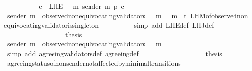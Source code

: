 \begin{isabellebody}
\ \ \ \ \ \ \isamarkupfalse%
\ \isamarkupfalse%
\ {\isachardoublequoteopen}{\isasymforall}\ c\ {\isasymin}\ L{\isacharunderscore}H{\isacharunderscore}E\ {\isacharparenleft}{\isasymsigma}\ {\isasymunion}\ {\isacharbraceleft}m{\isacharbraceright}{\isacharparenright}\ {\isacharparenleft}sender\ m{\isacharparenright}{\isachardot}\ p\ c{\isachardoublequoteclose}\isanewline
\ \ \ \ \ \ \ \ \isamarkupfalse%
\ {\isacartoucheopen}sender\ m\ {\isasymin}\ observed{\isacharunderscore}non{\isacharunderscore}equivocating{\isacharunderscore}validators\ {\isacharparenleft}{\isasymsigma}\ {\isasymunion}\ {\isacharbraceleft}m{\isacharbraceright}{\isacharparenright}{\isacartoucheclose}\ {\isacartoucheopen}{\isasymsigma}\ {\isasymunion}\ {\isacharbraceleft}m{\isacharbraceright}\ {\isasymin}\ {\isasymSigma}t{\isacartoucheclose}\ L{\isacharunderscore}H{\isacharunderscore}M{\isacharunderscore}of{\isacharunderscore}observed{\isacharunderscore}non{\isacharunderscore}equivocating{\isacharunderscore}validator{\isacharunderscore}is{\isacharunderscore}singleton\isanewline
\ \ \ \ \ \ \ \ \isamarkupfalse%
\ {\isacharparenleft}simp\ add{\isacharcolon}\ L{\isacharunderscore}H{\isacharunderscore}E{\isacharunderscore}def\ L{\isacharunderscore}H{\isacharunderscore}J{\isacharunderscore}def{\isacharparenright}\ \ \ \ \ \ \isanewline
\ \ \ \ \ \ \ \ \isamarkupfalse%
\isanewline
\ \ \ \ \ \ \isamarkupfalse%
\ \isamarkupfalse%
\ {\isacharquery}thesis\ \ \isanewline
\ \ \ \ \ \ \ \ \isamarkupfalse%
\ {\isacartoucheopen}sender\ m\ {\isasymin}\ observed{\isacharunderscore}non{\isacharunderscore}equivocating{\isacharunderscore}validators\ {\isacharparenleft}{\isasymsigma}\ {\isasymunion}\ {\isacharbraceleft}m{\isacharbraceright}{\isacharparenright}{\isacartoucheclose}\isanewline
\ \ \ \ \ \ \ \ \isamarkupfalse%
\ {\isacharparenleft}simp\ add{\isacharcolon}\ agreeing{\isacharunderscore}validators{\isacharunderscore}def\ agreeing{\isacharunderscore}def{\isacharparenright}\ \ \ \ \ \ \ \isanewline
\ \ \ \ \isamarkupfalse%
\isanewline
\ \ \ \ \isamarkupfalse%
\ \isamarkupfalse%
\ {\isacharquery}thesis\isanewline
\ \ \ \ \ \ \isamarkupfalse%
\ agreeing{\isacharunderscore}status{\isacharunderscore}of{\isacharunderscore}non{\isacharunderscore}sender{\isacharunderscore}not{\isacharunderscore}affected{\isacharunderscore}by{\isacharunderscore}minimal{\isacharunderscore}transitions\isanewline

\end{isabellebody}
